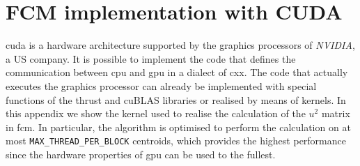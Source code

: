 \chapter{FCM implementation with CUDA} \label{appendix:fcm_kernel}
\gls{cuda} is a hardware architecture supported by the graphics processors of \emph{NVIDIA}, a US company. It is possible to implement the code that defines the communication between \gls{cpu} and \gls{gpu} in a dialect of \gls{cxx}. The code that actually executes the graphics processor can already be implemented with special functions of the \gls{thrust} and \gls{cuBLAS} libraries or realised by means of kernels. In this appendix we show the kernel used to realise the calculation of the $u^2$ matrix in \gls{fcm}. In particular, the algorithm is optimised to perform the calculation on at most \texttt{MAX\_THREAD\_PER\_BLOCK} centroids, which provides the highest performance since the hardware properties of \gls{gpu} can be used to the fullest.

